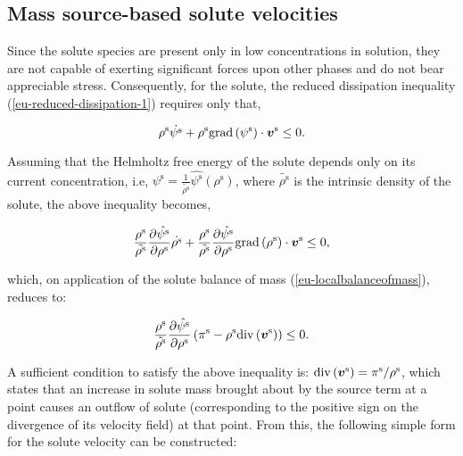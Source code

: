 \subsection{Mass source-based solute velocities}
\label{eu-solute-velocity}

Since the solute species are present only in low concentrations in solution,
they are not capable of exerting significant forces upon other phases
and do not bear appreciable stress. Consequently, for the solute, the
reduced dissipation inequality (\ref{eu-reduced-dissipation-1})
requires only that,

\begin{equation*}
\rho^{\mathrm{s}} \dot{\psi^{\mathrm{s}}} +
\rho^{\mathrm{s}} \mathrm{grad}\left(\psi^{\mathrm{s}}\right)
\cdot\mbox{\boldmath$ v$}^{\mathrm{s}} \leq 0.
\end{equation*}

Assuming that the Helmholtz free energy of the solute depends only on
its current concentration, i.e, $\psi^{\mathrm{s}} =
\frac{1}{\tilde{\rho^{\mathrm{s}}}} \hat{\psi^{\mathrm{s}}}
(\rho^{\mathrm{s}})$, where $\tilde{\rho^{\mathrm{s}}}$ is the
intrinsic density of the solute, the above inequality becomes,

\begin{equation*}
\frac{\rho^{\mathrm{s}}}{\tilde{\rho^{\mathrm{s}}}}
\frac{\partial \hat{\psi^{\mathrm{s}}}}{\partial \rho^{\mathrm{s}}}
\dot{\rho^{\mathrm{s}}}+
\frac{\rho^{\mathrm{s}}}{\tilde{\rho^{\mathrm{s}}}}
\frac{\partial \hat{\psi^{\mathrm{s}}}}{\partial \rho^{\mathrm{s}}}
\mathrm{grad}\left(\rho^{\mathrm{s}}\right) 
\cdot\mbox{\boldmath$ v$}^{\mathrm{s}}
\leq 0,
\end{equation*}

\noindent which, on application of the solute balance of mass
(\ref{eu-localbalanceofmass}), reduces to:

\begin{equation*}
\frac{\rho^{\mathrm{s}}}{\tilde{\rho^{\mathrm{s}}}}
\frac{\partial \hat{\psi^{\mathrm{s}}}}{\partial \rho^{\mathrm{s}}}
\left(\pi^{\mathrm{s}}- \rho^{\mathrm{s}} \mathrm{div}\left(\mbox{\boldmath$ v$}^{\mathrm{s}}
\right)\right) 
\leq 0.
\end{equation*}

\noindent A sufficient condition to satisfy the above inequality is:
$\mathrm{div}\left(\mbox{\boldmath$ v$}^{\mathrm{s}} \right) = \pi^{\mathrm{s}}/
\rho^{\mathrm{s}}$, which states that an increase in solute mass
brought about by the source term at a point causes an outflow of
solute (corresponding to the positive sign on the divergence of its
velocity field) at that point. From this, the following simple form
for the solute velocity can be constructed:


